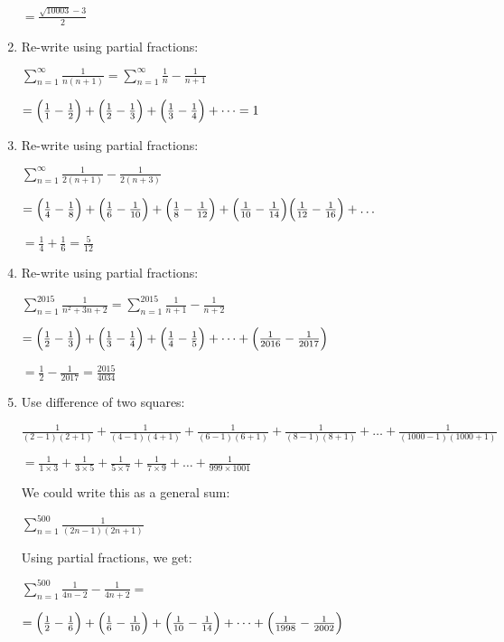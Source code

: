 \documentclass[../main.tex]{subfiles}
\begin{document}
\begin{enumerate}[itemsep=0.7cm]
    $=\frac{\sqrt{10003}-3}{2}$

    \item
    Re-write using partial fractions:

    $\sum\limits_{n=1}^\infty \frac{1}{n(n+1)}=\sum\limits_{n=1}^\infty \frac{1}{n}-\frac{1}{n+1}$

    $=\Bigl(\frac{1}{1}-\frac{1}{2}\Bigr)+\Bigl(\frac{1}{2}-\frac{1}{3}\Bigr)+\Bigl(\frac{1}{3}-\frac{1}{4}\Bigr)+\dots = 1$

    \item 
    Re-write using partial fractions:

    $\sum\limits_{n=1}^\infty \frac{1}{2(n+1)}-\frac{1}{2(n+3)}$

    $=\Bigl(\frac{1}{4}-\frac{1}{8}\Bigr)+\Bigl(\frac{1}{6}-\frac{1}{10}\Bigr)+\Bigl(\frac{1}{8}-\frac{1}{12}\Bigr)+\Bigl(\frac{1}{10}-\frac{1}{14}\Bigr)\Bigl(\frac{1}{12}-\frac{1}{16}\Bigr)+\dots$

    $=\frac{1}{4}+\frac{1}{6}=\frac{5}{12}$

    \item 
    Re-write using partial fractions:

    $\sum\limits_{n=1}^{2015} \frac{1}{n^2 +3n+2}=\sum\limits_{n=1}^{2015} \frac{1}{n+1}-\frac{1}{n+2}$

    $=\Bigl(\frac{1}{2}-\frac{1}{3}\Bigr)+\Bigl(\frac{1}{3}-\frac{1}{4}\Bigr)+\Bigl(\frac{1}{4}-\frac{1}{5}\Bigr)+\dots +\Bigl(\frac{1}{2016}-\frac{1}{2017}\Bigr)$

    $=\frac{1}{2}-\frac{1}{2017}=\frac{2015}{4034}$

    \item 
    Use difference of two squares:

    $\frac{1}{(2-1)(2+1)}+\frac{1}{(4-1)(4+1)}+\frac{1}{(6-1)(6+1)}+\frac{1}{(8-1)(8+1)}+\dots +\frac{1}{(1000-1)(1000+1)}$

    $=\frac{1}{1\times 3}+\frac{1}{3\times 5}+\frac{1}{5\times 7}+\frac{1}{7\times 9}+\dots +\frac{1}{999\times 1001}$

    We could write this as a general sum:

    $\sum\limits_{n=1}^{500} \frac{1}{(2n-1)(2n+1)}$

    Using partial fractions, we get:

    $\sum\limits_{n=1}^{500} \frac{1}{4n-2}-\frac{1}{4n+2}=$

    $=\Bigl(\frac{1}{2}-\frac{1}{6}\Bigr)+\Bigl(\frac{1}{6}-\frac{1}{10}\Bigr)+\Bigl(\frac{1}{10}-\frac{1}{14}\Bigr)+\dots +\Bigl(\frac{1}{1998}-\frac{1}{2002}\Bigr)$


\end{enumerate}
\end{document}
